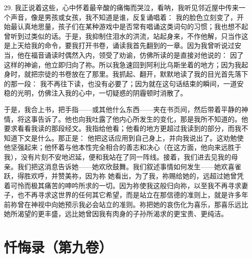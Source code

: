 29. 我正说着这些，心中怀着最辛酸的痛悔而哭泣，看呐，我听见邻近屋中传来一个声音，像是男孩或女孩，我不知道是谁，反复诵唱着： 我的脸色立刻变了，开始最认真地思量，孩子们在某种游戏中是否常有唱诵这类词句的习惯；我也想不起曾听到过类似的话。于是，我抑制住泪水的洪流，站起身来，不作他解，只当作这是上天给我的命令，要我打开书卷，诵读我首先翻到的一章。因为我曾听说过安当，他在福音诵读时偶然入内，领受了劝谕，仿佛所读的是直接对他说的：  因了这样的神谕，他立即归向了祢。所以我急速回到阿利比乌斯坐着的地方；因为我起身时，就把宗徒的书卷放在了那里。我抓起、翻开，默默地读了我的目光首先落下的那一段：  我不再往下读，也没有必要了；因为就在这句话结束的瞬间，一道安稳的光明，仿佛注入我的心中，一切疑惑的阴霾顿时消散了。\par

于是，我合上书，把手指——或其他什么东西——夹在书页间，然后带着平静的神情，将这事告诉了。他也向我吐露了他内心所发生的变化，那是我所不知道的。他要求看看我读的那段经文。我指给他看；他看的地方更超过我读到的部分，而我不知道下文是什么。那正是： 他把这话应用到自己身上，并向我说出了。这劝勉使他坚强起来；他怀着与他本性完全相合的善志和决心（在这方面，他向来远胜于我），没有片刻不安地迟延，便和我站在了同一阵线。接着，我们进去见我的母亲。我们把这消息告诉她——她欢欣鼓舞。我们叙述事情如何发生——她欢喜雀跃，得胜欢呼，并赞美祢，因为祢 她看出，为了我，祢赐给她的，远超过她曾凭着可怜而极其痛苦的呻吟所求的一切。因为祢使我这般归向祢，以至我不再寻求妻子，也不再寻求这世界的任何其它希望，而是站立在那信德的准则上，就是许多年前祢曾在神视中向她预示我必会站立的准则。祢把她的哀伤化为喜乐，那喜乐远比她所渴望的更丰盛，远比她曾因我有肉身的子孙所渴求的更宝贵、更纯洁。\par



\section{忏悔录（第九卷）}

